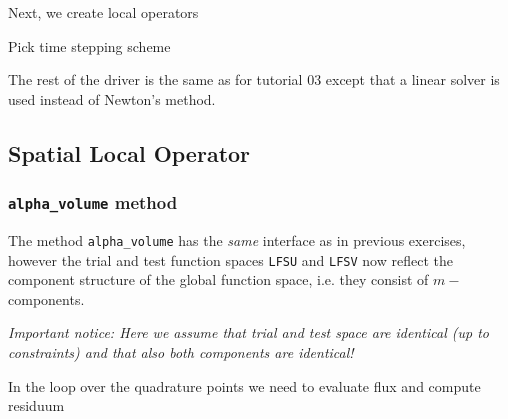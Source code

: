 \documentclass[a4paper,12pt]{article}
\theoremstyle{definition}
\theoremstyle{definition}
\begin{document}


Next, we create local operators



Pick time stepping scheme


The rest of the driver is the same as for tutorial 03 except that
a linear solver is used instead of Newton's method.




\subsection{Spatial Local Operator}


\subsubsection*{\lstinline{alpha_volume} method}

The method \lstinline{alpha_volume} has the \textit{same} interface
as in previous exercises, however the trial and test function spaces \lstinline{LFSU} and \lstinline{LFSV}
now reflect the component structure of the global function space, i.e.
they consist of $m-$components.

\textit{Important notice: Here we assume that trial and test space are identical
(up to constraints) and that also both components are identical!}


In the loop over the quadrature points we need to evaluate flux and compute residuum


\end{document}
